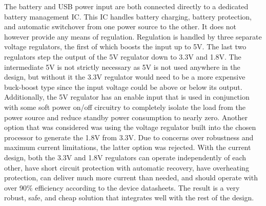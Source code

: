 The battery and USB power input are both connected directly to a dedicated 
battery management IC. This IC handles battery charging, battery protection,
and automatic switchover from one power source to the other. It does not 
however provide any means of regulation. Regulation is handled by three 
separate voltage regulators, the first of which boosts the input up to 5V. The 
last two regulators step the output of the 5V regulator down to 3.3V and 1.8V. 
The intermediate 5V is not strictly necessary as 5V is not used anywhere in the 
design, but without it the 3.3V regulator would need to be a more expensive 
buck-boost type since the input voltage could be above or below its output. 
Additionally, the 5V regulator has an enable input that is used in conjunction 
with some soft power on/off circuitry to completely isolate the load from the 
power source and reduce standby power consumption to nearly zero. Another option 
that was considered was using the voltage regulator built into the chosen 
processor to generate the 1.8V from 3.3V. Due to concerns over robustness and maximum current limitations, the latter option was rejected. 
With the current design, both the 3.3V and 1.8V regulators can operate independently of 
each other, have short circuit protection with automatic recovery, have overheating 
protection, can deliver much more current than needed, and should 
operate with over 90\% efficiency according to the device datasheets. The result 
is a very robust, safe, and cheap solution that integrates well with the rest of 
the design.

